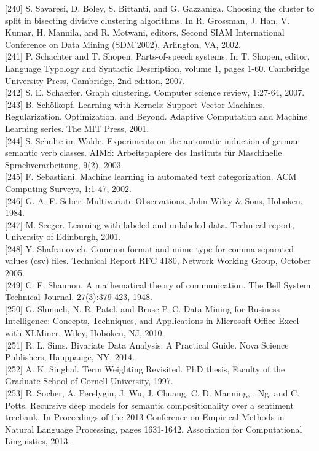 \documentclass[10pt]{book}
\begin{document}
[240] S. Savaresi, D. Boley, S. Bittanti, and G. Gazzaniga. Choosing the cluster to split in bisecting divisive clustering algorithms. In R. Grossman, J. Han, V. Kumar, H. Mannila, and R. Motwani, editors, Second SIAM International Conference on Data Mining (SDM'2002), Arlington, VA, 2002.\\[0pt]
[241] P. Schachter and T. Shopen. Parts-of-speech systems. In T. Shopen, editor, Language Typology and Syntactic Description, volume 1, pages 1-60. Cambridge University Press, Cambridge, 2nd edition, 2007.\\[0pt]
[242] S. E. Schaeffer. Graph clustering. Computer science review, 1:27-64, 2007.\\[0pt]
[243] B. Schölkopf. Learning with Kernels: Support Vector Machines, Regularization, Optimization, and Beyond. Adaptive Computation and Machine Learning series. The MIT Press, 2001.\\[0pt]
[244] S. Schulte im Walde. Experiments on the automatic induction of german semantic verb classes. AIMS: Arbeitspapiere des Instituts für Maschinelle Sprachverarbeitung, 9(2), 2003.\\[0pt]
[245] F. Sebastiani. Machine learning in automated text categorization. ACM Computing Surveys, 1:1-47, 2002.\\[0pt]
[246] G. A. F. Seber. Multivariate Observations. John Wiley \& Sons, Hoboken, 1984.\\[0pt]
[247] M. Seeger. Learning with labeled and unlabeled data. Technical report, University of Edinburgh, 2001.\\[0pt]
[248] Y. Shafranovich. Common format and mime type for comma-separated values (csv) files. Technical Report RFC 4180, Network Working Group, October 2005.\\[0pt]
[249] C. E. Shannon. A mathematical theory of communication. The Bell System Technical Journal, 27(3):379-423, 1948.\\[0pt]
[250] G. Shmueli, N. R. Patel, and Bruse P. C. Data Mining for Business Intelligence: Concepts, Techniques, and Applications in Microsoft Office Excel with XLMiner. Wiley, Hoboken, NJ, 2010.\\[0pt]
[251] R. L. Sims. Bivariate Data Analysis: A Practical Guide. Nova Science Publishers, Hauppauge, NY, 2014.\\[0pt]
[252] A. K. Singhal. Term Weighting Revisited. PhD thesis, Faculty of the Graduate School of Cornell University, 1997.\\[0pt]
[253] R. Socher, A. Perelygin, J. Wu, J. Chuang, C. D. Manning, . Ng, and C. Potts. Recursive deep models for semantic compositionality over a sentiment treebank. In Proceedings of the 2013 Conference on Empirical Methods in Natural Language Processing, pages 1631-1642. Association for Computational Linguistics, 2013.\\[0pt]
\end{document}
